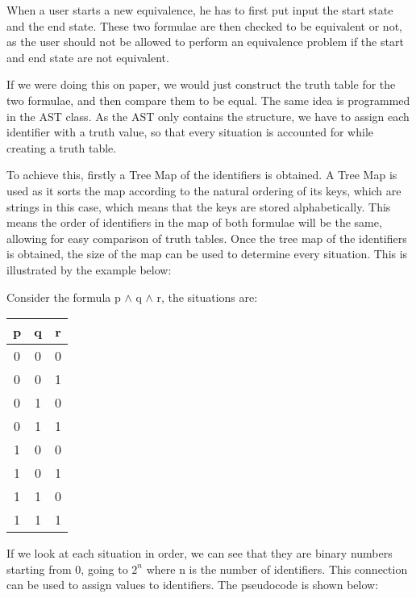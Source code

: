 \documentclass{report}
\begin{document}
When a user starts a new equivalence, he has to first put input the start
state and the end state. These two formulae are then checked to be equivalent
or not, as the user should not be allowed to perform an equivalence problem
if the start and end state are not equivalent.

If we were doing this on paper, we would just construct the truth table for
the two formulae, and then compare them to be equal. The same idea is programmed
in the AST class. As the AST only contains the structure, we have to assign each
identifier with a truth value, so that every situation is accounted for while
creating a truth table.

To achieve this, firstly a Tree Map of the identifiers is obtained. A Tree Map is
used as it sorts the map according to the natural ordering of its keys, which are
strings in this case, which means that the keys are stored alphabetically. This means
the order of identifiers in the map of both formulae will be the same, allowing for
easy comparison of truth tables. Once the tree map of the identifiers is obtained,
the size of the map can be used to determine every situation. This is illustrated
by the example below:

Consider the formula p $\land$ q $\land$ r, the situations are:

\begin{center}
  \begin{tabular}{| c | c | c |}
    \hline
    p & q & r\\ \hline
    0 & 0 & 0 \\
    0 & 0 & 1 \\
		0 & 1 & 0 \\
		0 & 1 & 1 \\
		1 & 0 & 0 \\
		1 & 0 & 1 \\
    1 & 1 & 0 \\
    1 & 1 & 1 \\ \hline
  \end{tabular}
\end{center}

If we look at each situation in order, we can see that they are binary numbers
starting from 0, going to $2^n$ where n is the number of identifiers. This
connection can be used to assign values to identifiers. The pseudocode is shown
below:
\end{document}
